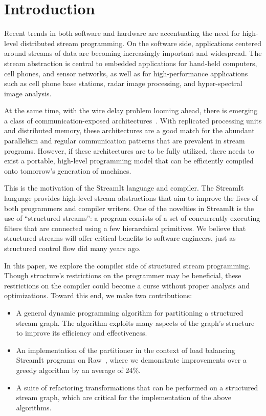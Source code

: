 \section{Introduction}

Recent trends in both software and hardware are accentuating the need for
high-level distributed stream programming.  On the software side,
applications centered around streams of data are becoming increasingly
important and widespread.  The stream abstraction is central to
embedded applications for hand-held computers, cell phones, and sensor
networks, as well as for high-performance applications such as cell
phone base stations, radar image processing, and hyper-spectral image
analysis.  

At the same time, with the wire delay problem looming ahead, there is
emerging a class of communication-exposed
architectures~\cite{raw-micro,trips,smartmemories}.  With replicated
processing units and distributed memory, these architectures are a
good match for the abundant parallelism and regular communication
patterns that are prevalent in stream programs.  However, if these
architectures are to be fully utilized, there needs to exist a
portable, high-level programming model that can be efficiently
compiled onto tomorrow's generation of machines.

This is the motivation of the StreamIt language and compiler.  The
StreamIt language provides high-level stream abstractions that aim to
improve the lives of both programmers and compiler writers.  One of
the novelties in StreamIt is the use of ``structured streams'': a
program consists of a set of concurrently executing filters that are
connected using a few hierarchical primitives.  We believe that
structured streams will offer critical benefits to software engineers,
just as structured control flow did many years ago.

In this paper, we explore the compiler side of structured stream
programming.  Though structure's restrictions on the programmer may be
beneficial, these restrictions on the compiler could become a curse
without proper analysis and optimizations.  Toward this end, we make
two contributions:
\begin{itemize}

\item A general dynamic programming algorithm for partitioning a
structured stream graph.  The algorithm exploits many aspects of the
graph's structure to improve its efficiency and effectiveness.

\item An implementation of the partitioner in the context of load
balancing StreamIt programs on Raw~\cite{raw-micro}, where we
demonstrate improvements over a greedy algorithm by an average of
24\%.

\item A suite of refactoring transformations that can be performed on
a structured stream graph, which are critical for the implementation
of the above algorithms.
\end{itemize}

